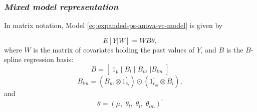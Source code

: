 \documentclass[12pt]{beamer}
\newcommand{\ms}{\scriptscriptstyle}
\begin{document}
\begin{frame}
\frametitle{\emph{Mixed model representation}}


In matrix notation, Model \ref{eq:expanded-ps-anova-vc-model} is given by

\begin{equation*}  
E \left[ Y | W \right] = WB \theta,
\end{equation*}
\noindent
where $W$ is the matrix of covariates holding the past values of $Y$, and $B$ is the $B$-spline regression basis:
\begin{equation} \label{eq:SANOVA-basis-matrix}
B = \left[\; 1_p \; \vert \;  B_l  \; \vert \;   B_m \; \vert B_{lm} \; \right]
\end{equation}
\noindent
\begin{equation*} \label{eq:rowwise-kronecker-product}
B_{lm}= \left( B_m \otimes 1^\prime_{c_l} \right) \odot \left(1^\prime_{c_m} \otimes  B_l  \right),
\end{equation*}
\noindent
and
\begin{equation*} 
\theta = \left(\mu, \;\theta_{\ms l}, \;\theta_{\ms l}, \;\theta_{\ms{lm}} \right)^\prime
\end{equation*}
\end{frame}




\end{document}
